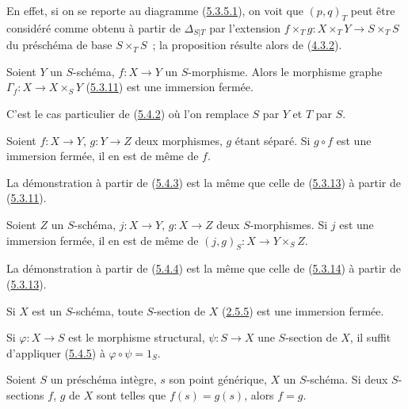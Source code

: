 En effet, si on se reporte au diagramme
(\hyperref[I.5.3.5.1-fr]{5.3.5.1}), on voit que $(p,q)_T$ peut être considéré
comme obtenu à partir de $\Delta_{S|T}$ par l'extension
$f\times_T g:X\times_T Y\to S\times_T S$ du préschéma de base $S\times_T S$~;
la proposition résulte alors de (\hyperref[I.4.3.2-fr]{4.3.2}).

\begin{corollary}[5.4.3]
\label{I.5.4.3-fr}
Soient $Y$ un $S$-schéma, $f:X\to Y$ un $S$-morphisme. Alors le morphisme
graphe $\Gamma_f:X\to X\times_S Y$ \textup{(\hyperref[I.5.3.11-fr]{5.3.11})} est une
immersion fermée.
\end{corollary}

C'est le cas particulier de (\hyperref[I.5.4.2-fr]{5.4.2}) où l'on remplace
$S$ par $Y$ et $T$ par $S$.

\begin{corollary}[5.4.4]
\label{I.5.4.4-fr}
Soient $f:X\to Y$, $g:Y\to Z$ deux morphismes, $g$ étant séparé. Si $g\circ f$
est une immersion fermée, il en est de même de $f$.
\end{corollary}

La démonstration à partir de (\hyperref[I.5.4.3-fr]{5.4.3}) est la même que
celle de (\hyperref[I.5.3.13-fr]{5.3.13}) à partir de
(\hyperref[I.5.3.11-fr]{5.3.11}).

\begin{corollary}[5.4.5]
\label{I.5.4.5-fr}
Soient $Z$ un $S$-schéma, $j:X\to Y$, $g:X\to Z$ deux $S$-morphismes. Si $j$
est une immersion fermée, il en est de même de
$(j,g)_S:X\to Y\times_S Z$.
\end{corollary}

La démonstration à partir de (\hyperref[I.5.4.4-fr]{5.4.4}) est la même que
celle de (\hyperref[I.5.3.14-fr]{5.3.14}) à partir de
(\hyperref[I.5.3.13-fr]{5.3.13}).

\begin{corollary}[5.4.6]
\label{I.5.4.6-fr}
Si $X$ est un $S$-schéma, toute $S$-section de $X$
\textup{(\hyperref[I.2.5.5-fr]{2.5.5})} est une immersion fermée.
\end{corollary}

Si $\varphi:X\to S$ est le morphisme structural, $\psi:S\to X$ une
$S$-section de $X$, il suffit d'appliquer
(\hyperref[I.5.4.5-fr]{5.4.5}) à $\varphi\circ\psi=1_S$.

\begin{corollary}[5.4.7]
\label{I.5.4.7-fr}
Soient $S$ un préschéma intègre, $s$ son point générique, $X$ un $S$-schéma.
Si deux $S$-sections $f$, $g$ de $X$ sont telles que $f(s)=g(s)$, alors
$f=g$.
\end{corollary}

